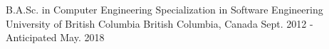 

\begin{cventries}

  \cveduentry
    {B.A.Sc. in Computer Engineering {\enskip\cdotp\enskip}Specialization in Software Engineering} %
    {University of British Columbia} %
    {British Columbia, Canada} %
    {Sept. 2012 - Anticipated May. 2018} %
    {} %
\end{cventries}
